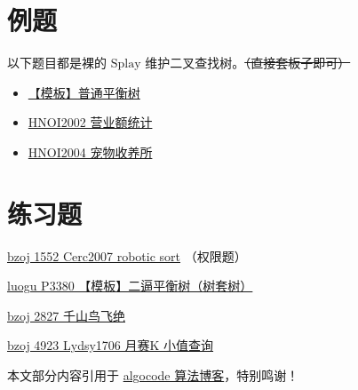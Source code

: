 \hr

\section{例题}

以下题目都是裸的 $\text{Splay}$ 维护二叉查找树。\sout{（直接套板子即可）}

\begin{itemize}
\item \href{https://www.luogu.org/problemnew/show/P3369}{【模板】普通平衡树}
\item \href{https://www.lydsy.com/JudgeOnline/problem.php?id=1588}{HNOI2002 营业额统计}
\item \href{https://www.lydsy.com/JudgeOnline/problem.php?id=1208}{HNOI2004 宠物收养所}
\end{itemize}

\section{练习题}

\href{https://www.lydsy.com/JudgeOnline/problem.php?id=1552}{bzoj 1552 Cerc2007 robotic sort} （权限题）

\href{https://www.luogu.org/problemnew/show/P3380}{luogu P3380 【模板】二逼平衡树（树套树）}

\href{https://www.lydsy.com/JudgeOnline/problem.php?id=2827}{bzoj 2827 千山鸟飞绝}

\href{https://www.lydsy.com/JudgeOnline/problem.php?id=4923}{bzoj 4923 Lydsy1706 月赛K 小值查询}

\hr

\begin{QUOTE}{}{}
本文部分内容引用于 \href{https://algocode.net}{algocode 算法博客}，特别鸣谢！
\end{QUOTE}
